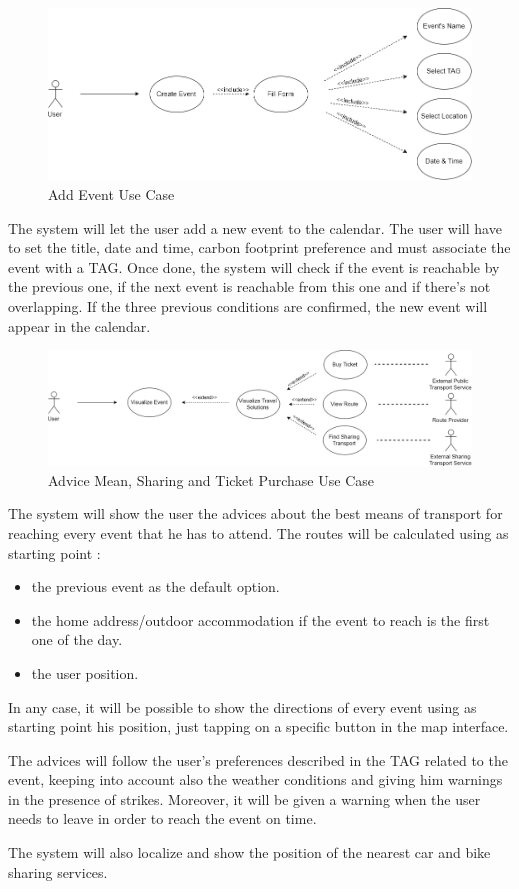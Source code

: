 \begin{figure}[H]
	\centering
	\includegraphics[scale=0.25]{Images/Use_Case/Add_Event}
	\caption{Add Event Use Case}
\end{figure}
The system will let the user add a new event to the calendar.  The user will have to set the title, date and time, carbon footprint preference and must associate the event with a TAG. 
Once done, the system will check if the event is reachable by the previous one, if the next event is reachable from this one and if there’s not overlapping. 
If the three previous conditions are confirmed, the new event will appear in the calendar.

\begin{figure}[H]
	\centering
	\includegraphics[scale=0.25]{Images/Use_Case/Advice_Mean}
	\caption{Advice Mean, Sharing and Ticket Purchase Use Case}
\end{figure}
The system will show the user the advices about the best means of transport for reaching every event that he has to attend. The routes will be calculated using as starting point :
\begin{itemize}
	\setlength{\leftskip}{1cm}
	\item the previous event as the default option.
	\item the home address/outdoor accommodation if the event to reach is the first one of the day.
	\item the user position.
\end{itemize}\par
In any case, it will be possible to show the directions of every event using as starting point his position, just tapping on a specific button in the map interface.\par
The advices will follow the user’s preferences described in the TAG related to the event, keeping into account also the weather conditions and giving him warnings in the presence of strikes. Moreover, it will be given a warning when the user needs to leave in order to reach the event on time.\par
The system will also localize and show the position of the nearest car and bike sharing services.

